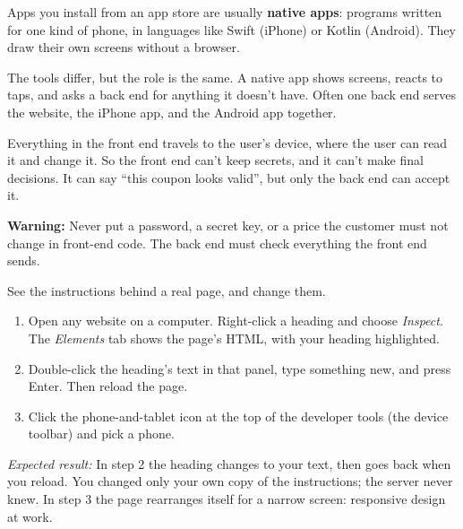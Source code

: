 \label{webapp-02:mobile-apps-are-front-ends-too}

Apps you install from an app store are usually \textbf{native apps}: programs written for one kind of phone, in languages like Swift (iPhone) or Kotlin (Android). They draw their own screens without a browser.

The tools differ, but the role is the same. A native app shows screens, reacts to taps, and asks a back end for anything it doesn't have. Often one back end serves the website, the iPhone app, and the Android app together.

\label{webapp-02:what-the-front-end-cant-do}

Everything in the front end travels to the user's device, where the user can read it and change it. So the front end can't keep secrets, and it can't make final decisions. It can say ``this coupon looks valid'', but only the back end can accept it.

\begin{warnbox}

\textbf{Warning:} Never put a password, a secret key, or a price the customer must not change in front-end code. The back end must check everything the front end sends.

\end{warnbox}

\label{webapp-02:try-it}

See the instructions behind a real page, and change them.

\begin{enumerate}
\def\labelenumi{\arabic{enumi}.}
\tightlist
\item
  Open any website on a computer. Right-click a heading and choose \emph{Inspect}. The \emph{Elements} tab shows the page's HTML, with your heading highlighted.
\item
  Double-click the heading's text in that panel, type something new, and press Enter. Then reload the page.
\item
  Click the phone-and-tablet icon at the top of the developer tools (the device toolbar) and pick a phone.
\end{enumerate}

\noindent{}\emph{Expected result:} In step 2 the heading changes to your text, then goes back when you reload. You changed only your own copy of the instructions; the server never knew. In step 3 the page rearranges itself for a narrow screen: responsive design at work.

